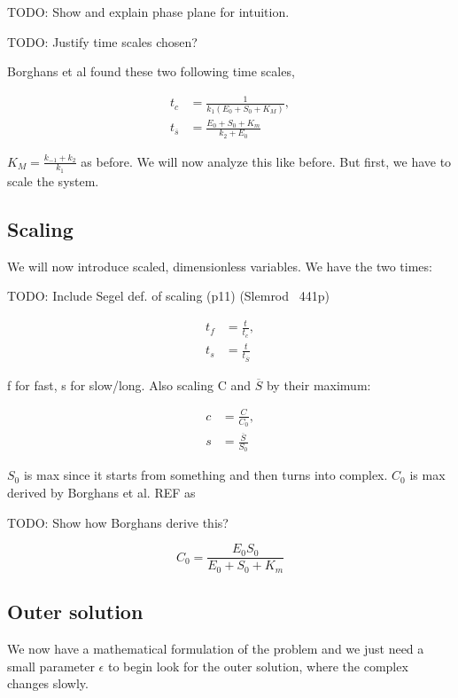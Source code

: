 \documentclass[12pt]{article}
\begin{document}
TODO: Show and explain phase plane for intuition.

TODO: Justify time scales chosen?

Borghans et al found these two following time scales,

\begin{align}
t_c &= \frac{1}{k_1(E_0+S_0+K_M)}, \\
t_{\overline{s}} &= \frac{E_0+S_0+K_m}{k_2+E_0}
\end{align}

$K_M = \frac{k_{-1}+k_2}{k_1}$ as before. We will now analyze this like before.
But first, we have to scale the system.

\subsection{Scaling}

We will now introduce scaled, dimensionless variables. We have the two times:

TODO: Include Segel def. of scaling (p11) (Slemrod ~441p)

\begin{align}
t_f &= \frac{t}{t_c}, \\
t_s &= \frac{t}{t_{\overline{S}}}
\end{align}

f for fast, s for slow/long. Also scaling C and $\overline{S}$ by their maximum:

\begin{align}
c &= \frac{C}{C_0}, \\
s &= \frac{\overline{S}}{S_0}
\end{align}

$S_0$ is max since it starts from something and then turns into complex. $C_0$
is max derived by Borghans et al. REF as

TODO: Show how Borghans derive this?

\begin{equation}
C_0 = \frac{E_0 S_0}{E_0 + S_0 + K_m}
\end{equation}

\subsection{Outer solution}

We now have a mathematical formulation of the problem and we just need a small
parameter $\epsilon$ to begin look for the outer solution, where the complex
changes slowly.
\end{document}
